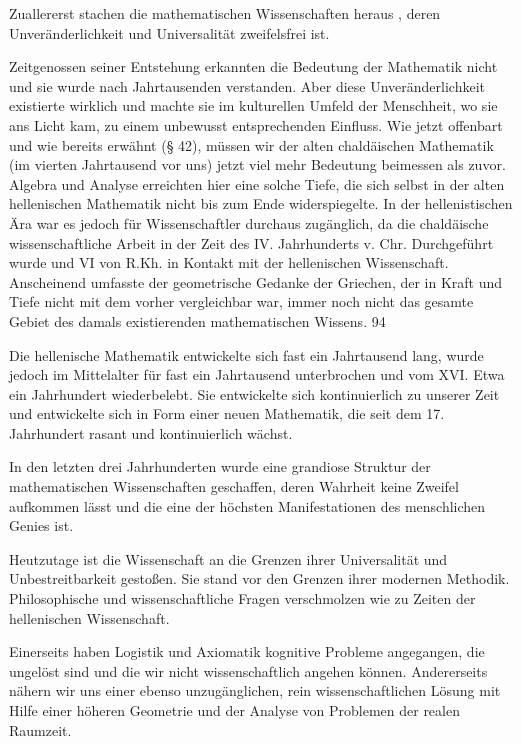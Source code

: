 \documentclass[11pt,a4paper]{book}
\begin{document}
Zuallererst stachen die mathematischen Wissenschaften heraus , deren Unveränderlichkeit und Universalität zweifelsfrei ist.



Zeitgenossen seiner Entstehung erkannten die Bedeutung der Mathematik nicht und sie wurde nach Jahrtausenden verstanden. Aber diese Unveränderlichkeit existierte wirklich und machte sie im kulturellen Umfeld der Menschheit, wo sie ans Licht kam, zu einem unbewusst entsprechenden Einfluss. Wie jetzt offenbart und wie bereits erwähnt (§ 42), müssen wir der alten chaldäischen Mathematik (im vierten Jahrtausend vor uns) jetzt viel mehr Bedeutung beimessen als zuvor. Algebra und Analyse erreichten hier eine solche Tiefe, die sich selbst in der alten hellenischen Mathematik nicht bis zum Ende widerspiegelte. In der hellenistischen Ära war es jedoch für Wissenschaftler durchaus zugänglich, da die chaldäische wissenschaftliche Arbeit in der Zeit des IV. Jahrhunderts v. Chr. Durchgeführt wurde und VI von R.Kh. in Kontakt mit der hellenischen Wissenschaft. Anscheinend umfasste der geometrische Gedanke der Griechen, der in Kraft und Tiefe nicht mit dem vorher vergleichbar war, immer noch nicht das gesamte Gebiet des damals existierenden mathematischen Wissens. 94



Die hellenische Mathematik entwickelte sich fast ein Jahrtausend lang, wurde jedoch im Mittelalter für fast ein Jahrtausend unterbrochen und vom XVI. Etwa ein Jahrhundert wiederbelebt. Sie entwickelte sich kontinuierlich zu unserer Zeit und entwickelte sich in Form einer neuen Mathematik, die seit dem 17. Jahrhundert rasant und kontinuierlich wächst.



In den letzten drei Jahrhunderten wurde eine grandiose Struktur der mathematischen Wissenschaften geschaffen, deren Wahrheit keine Zweifel aufkommen lässt und die eine der höchsten Manifestationen des menschlichen Genies ist.



Heutzutage ist die Wissenschaft an die Grenzen ihrer Universalität und Unbestreitbarkeit gestoßen. Sie stand vor den Grenzen ihrer modernen Methodik. Philosophische und wissenschaftliche Fragen verschmolzen wie zu Zeiten der hellenischen Wissenschaft.



Einerseits haben Logistik und Axiomatik kognitive Probleme angegangen, die ungelöst sind und die wir nicht wissenschaftlich angehen können. Andererseits nähern wir uns einer ebenso unzugänglichen, rein wissenschaftlichen Lösung mit Hilfe einer höheren Geometrie und der Analyse von Problemen der realen Raumzeit.
\end{document}
